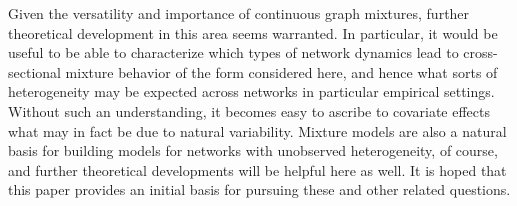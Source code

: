 \documentclass[11pt]{article}
\begin{document}
Given the versatility and importance of continuous graph mixtures, further theoretical development in this area seems warranted.  In particular, it would be useful to be able to characterize which types of network dynamics lead to cross-sectional mixture behavior of the form considered here, and hence what sorts of heterogeneity may be expected across networks in particular empirical settings.  Without such an understanding, it becomes easy to ascribe to covariate effects what may in fact be due to natural variability.  Mixture models are also a natural basis for building models for networks with unobserved heterogeneity, of course, and further theoretical developments will be helpful here as well.  It is hoped that this paper provides an initial basis for pursuing these and other related questions.



\end{document}
